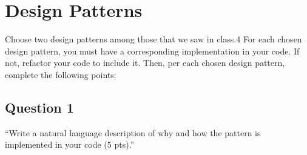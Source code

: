 \chapter{Design Patterns}

Choose two design patterns among those that we saw in class.4 For each chosen design pattern, you must have a corresponding implementation in your code. If not, refactor your code to include it. Then, per each chosen design pattern, complete the following points:

\section{Question 1}

``Write a natural language description of why and how the pattern is implemented in your code (5 pts).'' \\
